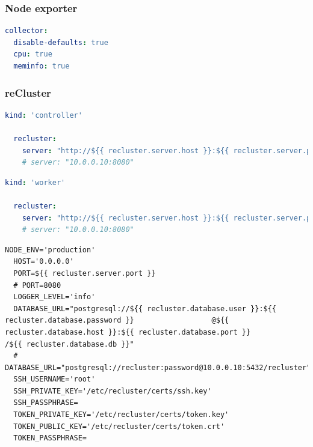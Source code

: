 \subsubsection{Node exporter}
\label{subsubsec:implementation_installer_configuration_files_node_exporter}


\begin{lstlisting}[language=yaml, alsoletter={.-}, morekeywords={[2]{collector, disable-defaults, cpu, meminfo}}, xleftmargin=\parindent, label={lst:node_exporter_config}, caption=TODO]
collector:
  disable-defaults: true
  cpu: true
  meminfo: true
\end{lstlisting}

\subsubsection{reCluster}
\label{subsubsec:implementation_installer_configuration_files_recluster}

\begin{lstlisting}[language=yaml, alsoletter={.}, morekeywords={[2]{kind, recluster, server}}, xleftmargin=\parindent, label={lst:recluster_controller_config}, caption=TODO]
  kind: 'controller'

  recluster:
    server: "http://${{ recluster.server.host }}:${{ recluster.server.port }}"
    # server: "10.0.0.10:8080"
\end{lstlisting}

\begin{lstlisting}[language=yaml, alsoletter={.}, morekeywords={[2]{kind, recluster, server}}, xleftmargin=\parindent, label={lst:recluster_worker_config}, caption=TODO]
  kind: 'worker'

  recluster:
    server: "http://${{ recluster.server.host }}:${{ recluster.server.port }}"
    # server: "10.0.0.10:8080"
\end{lstlisting}

\begin{lstlisting}[language=shell, alsoletter={_}, morestring={*[b]"}, morekeywords={[4]{NODE_ENV, HOST, PORT, LOGGER_LEVEL, DATABASE_URL, SSH_USERNAME, SSH_PRIVATE_KEY, SSH_PASSPHRASE, TOKEN_PRIVATE_KEY, TOKEN_PUBLIC_KEY, TOKEN_PASSPHRASE}}, xleftmargin=\parindent, label={lst:recluster_server_config}, caption=TODO]
  NODE_ENV='production'
  HOST='0.0.0.0'
  PORT=${{ recluster.server.port }}
  # PORT=8080
  LOGGER_LEVEL='info'
  DATABASE_URL="postgresql://${{ recluster.database.user }}:${{ recluster.database.password }}                  @${{ recluster.database.host }}:${{ recluster.database.port }}                                /${{ recluster.database.db }}"
  # DATABASE_URL="postgresql://recluster:password@10.0.0.10:5432/recluster"
  SSH_USERNAME='root'
  SSH_PRIVATE_KEY='/etc/recluster/certs/ssh.key'
  SSH_PASSPHRASE=
  TOKEN_PRIVATE_KEY='/etc/recluster/certs/token.key'
  TOKEN_PUBLIC_KEY='/etc/recluster/certs/token.crt'
  TOKEN_PASSPHRASE=
\end{lstlisting}

